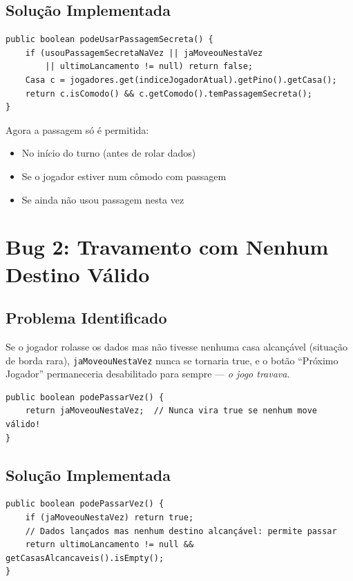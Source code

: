 \documentclass[12pt,a4paper]{report}
\begin{document}
\subsection{Solução Implementada}

\begin{lstlisting}
public boolean podeUsarPassagemSecreta() {
    if (usouPassagemSecretaNaVez || jaMoveouNestaVez
        || ultimoLancamento != null) return false;
    Casa c = jogadores.get(indiceJogadorAtual).getPino().getCasa();
    return c.isComodo() && c.getComodo().temPassagemSecreta();
}
\end{lstlisting}

Agora a passagem só é permitida:
\begin{itemize}
    \item No início do turno (antes de rolar dados)
    \item Se o jogador estiver num cômodo com passagem
    \item Se ainda não usou passagem nesta vez
\end{itemize}

\section{Bug 2: Travamento com Nenhum Destino Válido}

\subsection{Problema Identificado}

Se o jogador rolasse os dados mas não tivesse nenhuma casa alcançável (situação de borda rara), \texttt{jaMoveouNestaVez} nunca se tornaria true, e o botão ``Próximo Jogador'' permaneceria desabilitado para sempre --- \textit{o jogo travava}.

\begin{lstlisting}
public boolean podePassarVez() {
    return jaMoveouNestaVez;  // Nunca vira true se nenhum move válido!
}
\end{lstlisting}

\subsection{Solução Implementada}

\begin{lstlisting}
public boolean podePassarVez() {
    if (jaMoveouNestaVez) return true;
    // Dados lançados mas nenhum destino alcançável: permite passar
    return ultimoLancamento != null && getCasasAlcancaveis().isEmpty();
}
\end{lstlisting}
\end{document}
